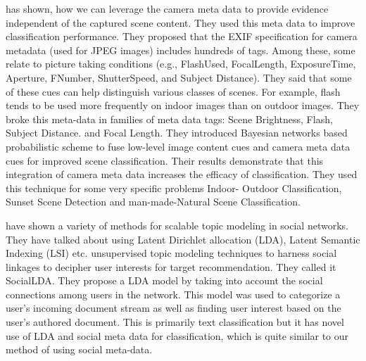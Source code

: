 \citet*{Boutell2005935} has shown, how we can leverage the camera
meta data to provide evidence independent of the captured scene
content. They used this meta data to improve classification
performance. They proposed that the EXIF specification for camera
metadata (used for JPEG images) includes hundreds of tags. Among
these, some relate to picture taking conditions (e.g., FlashUsed,
FocalLength, ExposureTime, Aperture, FNumber, ShutterSpeed, and
Subject Distance). They said that some of these cues can help
distinguish various classes of scenes. For example, flash tends to
be used more frequently on indoor images than on outdoor images.
They broke this meta-data in families of meta data tags: Scene
Brightness, Flash, Subject Distance. and Focal Length. They
introduced  Bayesian networks based  probabilistic scheme to fuse low-level
image content cues and camera meta data cues for improved scene
classification. Their results demonstrate that  this integration of
camera meta data increases the efficacy of classification.
They used this technique for some very specific problems  Indoor-
Outdoor Classification, Sunset Scene Detection and man-made-Natural
Scene Classification.


 have shown a variety of methods for scalable
topic modeling in social networks.  They have talked about using
Latent Dirichlet allocation (LDA), Latent Semantic Indexing (LSI) etc.
unsupervised topic modeling techniques to harness social linkages
to decipher user interests for target recommendation. They called it
SocialLDA. They propose a LDA model by taking into account the
social connections among users in the network. This model was used
to categorize a user's incoming document stream as well as finding
user interest based on the user’s authored document. This is
primarily text classification but it has novel use of LDA and
social meta data for classification, which is quite
similar to our method of using social meta-data.

